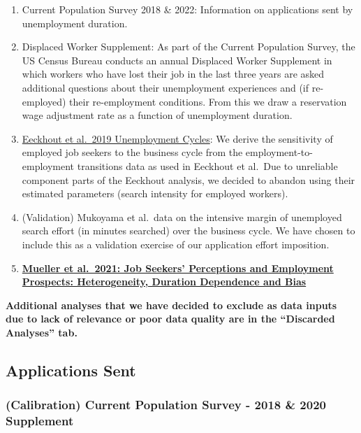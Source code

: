 \documentclass[
]{article}
\begin{document}
\begin{enumerate}
\def\labelenumi{\arabic{enumi}.}
\item
  Current Population Survey 2018 \& 2022: Information on applications
  sent by unemployment duration.
\item
  Displaced Worker Supplement: As part of the Current Population Survey,
  the US Census Bureau conducts an annual Displaced Worker Supplement in
  which workers who have lost their job in the last three years are
  asked additional questions about their unemployment experiences and
  (if re-employed) their re-employment conditions. From this we draw a
  reservation wage adjustment rate as a function of unemployment
  duration.
\item
  \href{https://www.aeaweb.org/articles?id=10.1257/mac.20180105}{Eeckhout
  et al.~2019 Unemployment Cycles}: We derive the sensitivity of
  employed job seekers to the business cycle from the
  employment-to-employment transitions data as used in Eeckhout et
  al.~Due to unreliable component parts of the Eeckhout analysis, we
  decided to abandon using their estimated parameters (search intensity
  for employed workers).
\item
  (Validation) Mukoyama et al.~data on the intensive margin of
  unemployed search effort (in minutes searched) over the business
  cycle. We have chosen to include this as a validation exercise of our
  application effort imposition.
\item
  \href{https://www.aeaweb.org/articles?id=10.1257/aer.20190808}{\textbf{Mueller
  et al.~2021: Job Seekers' Perceptions and Employment Prospects:
  Heterogeneity, Duration Dependence and Bias}}
\end{enumerate}

\textbf{Additional analyses that we have decided to exclude as data
inputs due to lack of relevance or poor data quality are in the
``Discarded Analyses'' tab.}

\subsection{Applications Sent}\label{applications-sent}

\subsubsection{(Calibration) Current Population Survey - 2018 \& 2020
Supplement}\label{calibration-current-population-survey---2018-2020-supplement}
\end{document}

